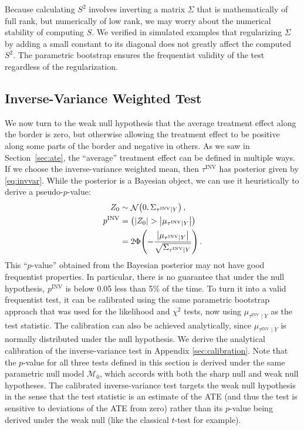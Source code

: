 \documentclass[letter]{article}
\DeclarePairedDelimiter{\parenthesis}{\lparen}{\rparen}
\DeclarePairedDelimiter{\absolutevalue}{\lvert}{\rvert}
\newcommand{\del}[1]{\parenthesis*{#1}}
\newcommand{\abs}[1]{\absolutevalue*{#1}}
\let\Pr\relax
\DeclareMathOperator{\Pr}{\mathbb{P}}
\DeclareMathOperator{\normal}{\mathcal{N}}
\newcommand{\invvar}{\tau^{\mathrm{INV}}}
\newcommand{\modnull}{\mathscr{M}_0}
\begin{document}
Because calculating \(S^2\) involves inverting a matrix \(\Sigma\) that is mathematically of full rank, but numerically of low rank, we may worry about the numerical stability of computing \(S\).
We verified in simulated examples that regularizing \(\Sigma\) by adding a small constant to its diagonal does not greatly affect the computed \(S^2\).
The parametric bootstrap ensures the frequentist validity of the test
regardless of the regularization.
    


    	\hypertarget{inverse-variance-weighted-test}{%
\subsection{Inverse-Variance Weighted Test}\label{inverse-variance-weighted-test}}

We now turn to the weak null hypothesis that the average treatment effect along the border is zero, but otherwise allowing the treatment effect to be positive along some parts of the border and negative in others.
As we saw in Section~\ref{sec:ate}, the ``average'' treatment effect can be defined in multiple ways.
If we choose the inverse-variance weighted mean, then \(\invvar\) has posterior given by \eqref{eq:invvar}.
While the posterior is a Bayesian object, we can use it heuristically to derive a pseudo-\(p\)-value:
\begin{equation}
\begin{split}
    Z_0 &\sim \normal\del{0, \Sigma_{\invvar \mid Y}} \,, \\
    p^{\mathrm{INV}} &= \Pr\del{ 
        \abs{Z_0} > 
        \abs{
            \mu_{
                \invvar \mid Y
            }
        } 
    } \\
    &= 2\Phi\del{-
        \frac{
            \abs{
                \mu_{
                    \invvar \mid Y
                }
            }
        }{
            \sqrt{
                \Sigma_{\invvar \mid Y}
            }
        }
    } \,.
\end{split}
\end{equation}
This ``\(p\)-value'' obtained from the Bayesian posterior may not have good frequentist properties.
In particular, there is no guarantee that under the null hypothesis, \(p^{\mathrm{INV}}\) is below 0.05 less than 5\% of the time.
To turn it into a valid frequentist test, it can be calibrated using the same parametric bootstrap approach that was used for the likelihood and \(\chi^2\) tests, now using \(\mu_{\invvar \mid Y}\) as the test statistic.
The calibration can also be achieved analytically, since \(\mu_{\invvar \mid Y}\) is normally distributed under the null hypothesis.
We derive the analytical calibration of the inverse-variance test in Appendix \ref{sec:calibration}.
Note that the \(p\)-value for all three tests defined in this section is derived under the same parametric null model \(\modnull\), which accords with both the sharp null and weak null hypotheses.
The calibrated inverse-variance test targets the weak null hypothesis in the sense that the test statistic is an estimate of the ATE (and thus the test is sensitive to deviations of the ATE from zero) rather than its \(p\)-value being derived under the weak null (like the classical \(t\)-test for example).
\end{document}
